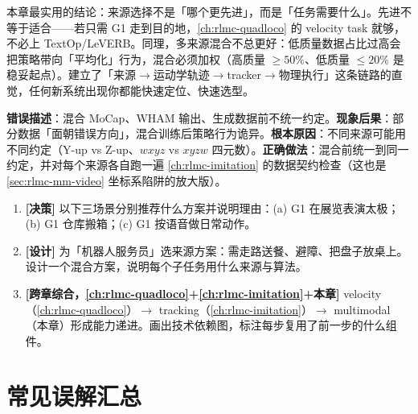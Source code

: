 \begin{insight}\label{ins:rlmc-mm-choose}
本章最实用的结论：来源选择不是「哪个更先进」，而是「任务需要什么」。先进不等于适合——若只需 G1 走到目的地，\cref{ch:rlmc-quadloco} 的 velocity task 就够，不必上 TextOp/LeVERB。同理，多来源混合不总更好：低质量数据占比过高会把策略带向「平均化」行为，混合必须加权（高质量 $\ge 50\%$、低质量 $\le 20\%$ 是稳妥起点）。建立了「来源$\to$运动学轨迹$\to$tracker$\to$物理执行」这条链路的直觉，任何新系统出现你都能快速定位、快速选型。
\end{insight}

\begin{pitfall}
\textbf{错误描述}：混合 MoCap、WHAM 输出、生成数据前不统一约定。\textbf{现象后果}：部分数据「面朝错误方向」，混合训练后策略行为诡异。\textbf{根本原因}：不同来源可能用不同约定（Y-up vs Z-up、$wxyz$ vs $xyzw$ 四元数）。\textbf{正确做法}：混合前统一到同一约定，并对每个来源各自跑一遍 \cref{ch:rlmc-imitation} 的数据契约检查（这也是 \cref{sec:rlmc-mm-video} 坐标系陷阱的放大版）。
\end{pitfall}

\begin{practice}[练习·选型]
\begin{enumerate}
  \item \textbf{[决策]} 以下三场景分别推荐什么方案并说明理由：(a) G1 在展览表演太极；(b) G1 仓库搬箱；(c) G1 按语音做日常动作。
  \item \textbf{[设计]} 为「机器人服务员」选来源方案：需走路送餐、避障、把盘子放桌上。设计一个混合方案，说明每个子任务用什么来源与算法。
  \item \textbf{[跨章综合，\cref{ch:rlmc-quadloco}+\cref{ch:rlmc-imitation}+本章]} velocity（\cref{ch:rlmc-quadloco}）$\to$ tracking（\cref{ch:rlmc-imitation}）$\to$ multimodal（本章）形成能力递进。画出技术依赖图，标注每步复用了前一步的什么组件。
\end{enumerate}
\end{practice}

\section*{常见误解汇总}
\label{sec:rlmc-mm-misconceptions}

